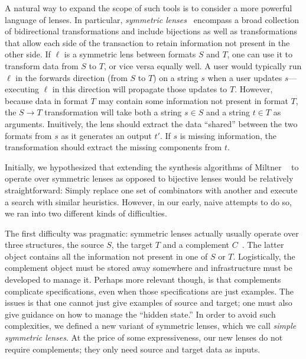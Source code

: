 \documentclass[acmsmall,screen,anonymous]{acmart}
\begin{document}
A natural way to expand the scope of such tools is to consider a more
powerful language of lenses.  In particular, \emph{symmetric
lenses}~\cite{symmetric-lenses} encompass a broad collection of bidirectional
transformations and include bijections as well as transformations that
allow each side of the transaction to retain information not present
in the other side.  If $\ell$ is a symmetric lens between formats $S$ and $T$, one can
use it to transform data from $S$ to $T$, or vice versa equally well.  A user would typically
run $\ell$ in the forwards direction (from $S$ to $T$) on a string $s$ when a user updates
$s$---executing $\ell$ in this direction will propagate those updates to $T$.
However, because data in format $T$ may contain some information not present in format $T$,
the $S \rightarrow T$ transformation will take
both a string $s \in S$ and a string $t \in T$ as arguments.
Inuitively, the lens should extract the data ``shared'' between the two formats from $s$
as it generates an output $t'$.  If $s$ is missing information, the transformation should
extract the missing components from $t$.

Initially, we hypothesized that extending the synthesis algorithms
of Miltner \ETAL~\cite{miltner+:bijective-synthesis} to operate over symmetric lenses
as opposed to bijective lenses 
would be relatively straightforward:  Simply replace one set of combinators with another
and execute a search with similar heuristics.  However, in our early,
naive attempts to do so, we ran
into two different kinds of difficulties. 

The first difficulty was pragmatic: symmetric lenses actually usually operate
over three structures, the source $S$, the target $T$ and a complement
$C$~\cite{symmetric-lenses}. The latter object contains all the information not
present in one of $S$ or $T$. Logistically, the complement object must be stored
away somewhere and infrastructure must be developed to manage it. Perhaps more
relevant though, is that complements complicate specifications, even when those
specifications are just examples. The issues is that one cannot just give
examples of source and target; one must also give guidance on how to manage the
``hidden state.'' In order to avoid such complexities, we defined a new variant
of symmetric lenses, which we call \emph{simple symmetric lenses}. At the price
of some expressiveness, our new lenses do not require complements; they only
need source and target data as inputs.
\end{document}
